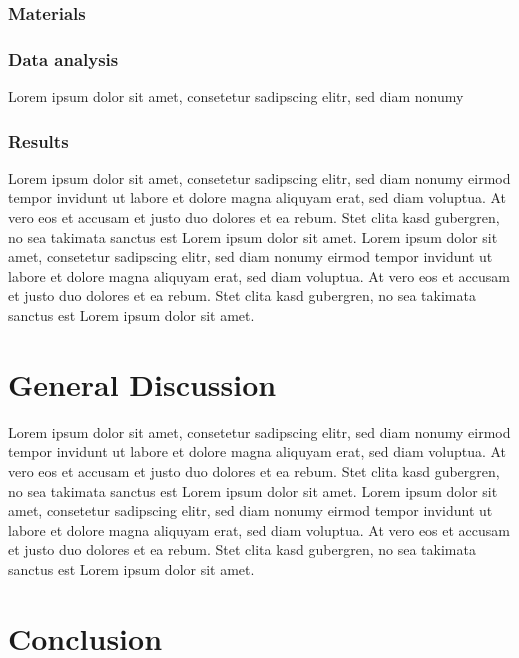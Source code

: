 \documentclass[
  man]{apa6}
\begin{document}
\subsubsection{Materials}\label{materials-2}

\subsubsection{Data analysis}\label{data-analysis-2}

Lorem ipsum dolor sit amet, consetetur sadipscing elitr, sed diam nonumy

\subsubsection{Results}\label{results-2}

Lorem ipsum dolor sit amet, consetetur sadipscing elitr, sed diam nonumy eirmod tempor invidunt ut labore et dolore magna aliquyam erat, sed diam voluptua. At vero eos et accusam et justo duo dolores et ea rebum. Stet clita kasd gubergren, no sea takimata sanctus est Lorem ipsum dolor sit amet. Lorem ipsum dolor sit amet, consetetur sadipscing elitr, sed diam nonumy eirmod tempor invidunt ut labore et dolore magna aliquyam erat, sed diam voluptua. At vero eos et accusam et justo duo dolores et ea rebum. Stet clita kasd gubergren, no sea takimata sanctus est Lorem ipsum dolor sit amet.

\section{General Discussion}\label{general-discussion}

Lorem ipsum dolor sit amet, consetetur sadipscing elitr, sed diam nonumy eirmod tempor invidunt ut labore et dolore magna aliquyam erat, sed diam voluptua. At vero eos et accusam et justo duo dolores et ea rebum. Stet clita kasd gubergren, no sea takimata sanctus est Lorem ipsum dolor sit amet. Lorem ipsum dolor sit amet, consetetur sadipscing elitr, sed diam nonumy eirmod tempor invidunt ut labore et dolore magna aliquyam erat, sed diam voluptua. At vero eos et accusam et justo duo dolores et ea rebum. Stet clita kasd gubergren, no sea takimata sanctus est Lorem ipsum dolor sit amet.

\section{Conclusion}\label{conclusion}
\end{document}
